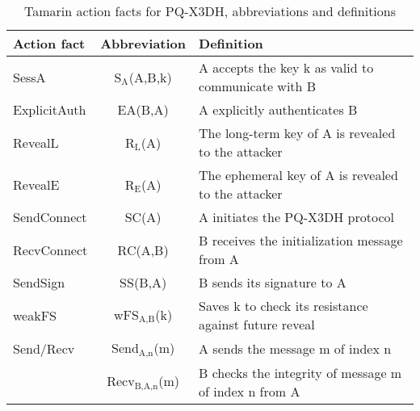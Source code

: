\begin{table}[!ht]
    \centering
        \caption{Tamarin action facts for PQ-X3DH, abbreviations and definitions}
    \begin{tabular}{|l|c|l|}
    \hline
        Action fact & Abbreviation & Definition \\
        \hline
        \hline
        SessA & S$_\text{A}$(A,B,k)  & A accepts the key k as valid to communicate with B \\
        \hline
        ExplicitAuth & EA(B,A) & A explicitly authenticates B\\
          \hline
        RevealL & R$_\text{L}$(A) &  The long-term key of A is revealed to the attacker\\
            \hline
        RevealE & R$_\text{E}$(A) &  The ephemeral key of A is revealed to the attacker\\
              \hline
        SendConnect & SC(A) & A initiates the PQ-X3DH protocol\\
                \hline
        RecvConnect & RC(A,B) & B receives the initialization message from A\\
                  \hline
        SendSign & SS(B,A) & B sends its signature to A\\
                    \hline
        weakFS & wFS$_{\text{A,B}}$(k) & Saves k to check its resistance against future reveal\\
                      \hline
        Send/Recv & Send$_{\text{A,n}}$(m) & A sends the message m of index n\\ 
        & Recv$_{\text{B,A,n}}$(m)& B checks the integrity of message m of index n from A\\
        \hline
    \end{tabular}
    \label{tab:X3DHTam}
\end{table}

